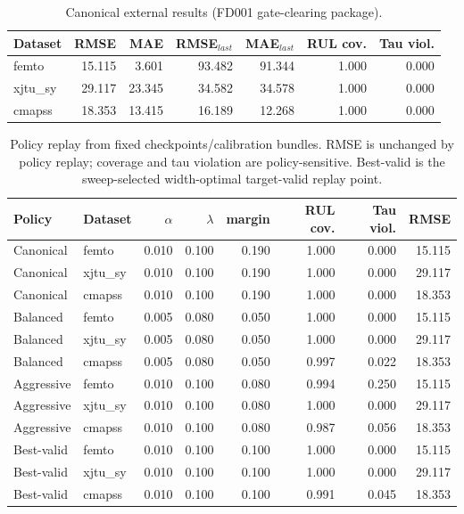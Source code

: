 \begin{table}[t]
\centering
\caption{Canonical external results (FD001 gate-clearing package).}
\label{tab:external-canonical}
\begin{tabular}{lrrrrrr}
\toprule
Dataset & RMSE & MAE & RMSE$_{last}$ & MAE$_{last}$ & RUL cov. & Tau viol.\\
\midrule
femto & 15.115 & 3.601 & 93.482 & 91.344 & 1.000 & 0.000\\
xjtu\_sy & 29.117 & 23.345 & 34.582 & 34.578 & 1.000 & 0.000\\
cmapss & 18.353 & 13.415 & 16.189 & 12.268 & 1.000 & 0.000\\
\bottomrule
\end{tabular}
\end{table}

\begin{table}[t]
\centering
\caption{Policy replay from fixed checkpoints/calibration bundles. RMSE is unchanged by policy replay; coverage and tau violation are policy-sensitive. Best-valid is the sweep-selected width-optimal target-valid replay point.}
\label{tab:policy-replay}
\begin{tabular}{llrrrrrr}
\toprule
Policy & Dataset & $\alpha$ & $\lambda$ & margin & RUL cov. & Tau viol. & RMSE\\
\midrule
Canonical & femto & 0.010 & 0.100 & 0.190 & 1.000 & 0.000 & 15.115\\
Canonical & xjtu\_sy & 0.010 & 0.100 & 0.190 & 1.000 & 0.000 & 29.117\\
Canonical & cmapss & 0.010 & 0.100 & 0.190 & 1.000 & 0.000 & 18.353\\
\midrule
Balanced & femto & 0.005 & 0.080 & 0.050 & 1.000 & 0.000 & 15.115\\
Balanced & xjtu\_sy & 0.005 & 0.080 & 0.050 & 1.000 & 0.000 & 29.117\\
Balanced & cmapss & 0.005 & 0.080 & 0.050 & 0.997 & 0.022 & 18.353\\
\midrule
Aggressive & femto & 0.010 & 0.100 & 0.080 & 0.994 & 0.250 & 15.115\\
Aggressive & xjtu\_sy & 0.010 & 0.100 & 0.080 & 1.000 & 0.000 & 29.117\\
Aggressive & cmapss & 0.010 & 0.100 & 0.080 & 0.987 & 0.056 & 18.353\\
\midrule
Best-valid & femto & 0.010 & 0.100 & 0.100 & 1.000 & 0.000 & 15.115\\
Best-valid & xjtu\_sy & 0.010 & 0.100 & 0.100 & 1.000 & 0.000 & 29.117\\
Best-valid & cmapss & 0.010 & 0.100 & 0.100 & 0.991 & 0.045 & 18.353\\
\bottomrule
\end{tabular}
\end{table}

